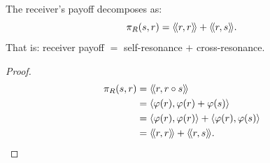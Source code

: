 \begin{theorem}
\label{thm:receiver-payoff}
The receiver's payoff decomposes as:
\[
  \pi_{R}(s, r) = \langle\!\langle r, r \rangle\!\rangle + \langle\!\langle r, s \rangle\!\rangle.
\]
That is: receiver payoff $=$ self-resonance $+$ cross-resonance.
\end{theorem}

\begin{proof}
\begin{align*}
  \pi_{R}(s, r)
  &= \langle\!\langle r, r \circ s \rangle\!\rangle \\
  &= \langle \varphi(r), \varphi(r) + \varphi(s) \rangle \\
  &= \langle \varphi(r), \varphi(r) \rangle + \langle \varphi(r), \varphi(s) \rangle \\
  &= \langle\!\langle r, r \rangle\!\rangle + \langle\!\langle r, s \rangle\!\rangle.
\end{align*}
\end{proof}

